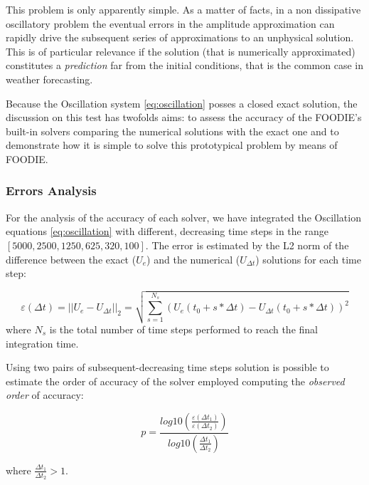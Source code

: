 This problem is only apparently simple. As a matter of facts, in a non dissipative oscillatory problem the eventual errors in the amplitude approximation can rapidly drive the subsequent series of approximations to an unphysical solution. This is of particular relevance if the solution (that is numerically approximated) constitutes a \emph{prediction} far from the initial conditions, that is the common case in weather forecasting.

Because the Oscillation system \ref{eq:oscillation} posses a closed exact solution, the discussion on this test has twofolds aims: to assess the accuracy of the FOODIE's built-in solvers comparing the numerical solutions with the exact one and to demonstrate how it is simple to solve this prototypical problem by means of FOODIE.

\subsubsection{Errors Analysis}

For the analysis of the accuracy of each solver, we have integrated the Oscillation equations \ref{eq:oscillation} with different, decreasing time steps in the range $[5000, 2500, 1250, 625, 320, 100]$. The error is estimated by the L2 norm of the difference between the exact ($U_e$) and the numerical ($U_{\Delta t}$) solutions for each time step:

\begin{equation}
  \varepsilon (\Delta t) = || U_e - U_{\Delta t} ||_2 = \sqrt{ \sum_{s=1}^{N_s} { \left(U_e(t_0 + s * \Delta t) - U_{\Delta t}(t_0 + s * \Delta t) \right)^2 }}
\label{eq:oscillation-error}
\end{equation}
where $N_s$ is the total number of time steps performed to reach the final integration time.

Using two pairs of subsequent-decreasing time steps solution is possible to estimate the order of accuracy of the solver employed computing the \emph{observed order} of accuracy:

\begin{equation}
  p = \frac{log10 \left( \frac{\varepsilon (\Delta t_1)}{\varepsilon (\Delta t_2)} \right)}{log10 \left( \frac{\Delta t_1}{\Delta t_2} \right)}
\label{eq:oscillation-observed-order}
\end{equation}

where $\frac{\Delta t_1}{\Delta t_2}>1$.














